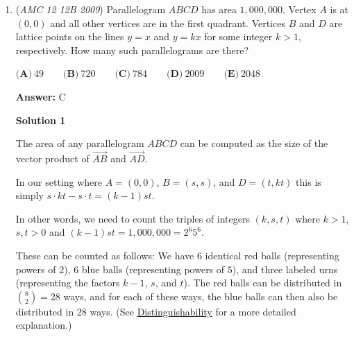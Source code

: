 \begin{enumerate}
 In the first "case" if woman \#$10$ sits in the seat \#$10$, this leads to a similar scenario, but with $9$ women instead. That means that for this case, there are a total of $S_{9}$ possible arrangements. We don't know how many exactly, but we are able to define it in terms of $S$.

 During the second "case", woman \#$10$ sits in seat \#$9$. This time, woman \#9 must go to seat \#$10$, as she is the only other person who can go there. This leaves us with $8$ women, and we again represent this in terms of $S \Rightarrow S_8$.

 Therefore, we can write $S_{10}$ in terms of $S_8$ and $S_9$, like so:

 
 \[S_{10} = S_8 + S_9.\]

 We can then generalize this to say

 
 \[S_n = S_{n-1}+S_{n-2}.\]

 Calculating $S_1 = 1$ and $S_2 =2,$ then following the recursive rule from above, we get $S_{10} = 89 \Rightarrow \boxed{\text{A}}$.

 


	\item (\textit{AMC 12 12B 2009}) Parallelogram $ABCD$ has area $1,\!000,\!000$. Vertex $A$ is at $(0,0)$ and all other vertices are in the first quadrant. Vertices $B$ and $D$ are lattice points on the lines $y = x$ and $y = kx$ for some integer $k > 1$, respectively. How many such parallelograms are there?


 $\textbf{(A)}\ 49\qquad \textbf{(B)}\ 720\qquad \textbf{(C)}\ 784\qquad \textbf{(D)}\ 2009\qquad \textbf{(E)}\ 2048$

 \textbf{Answer: }C



\textbf{Solution 1}

The area of any parallelogram $ABCD$ can be computed as the size of the vector product of $\overrightarrow{AB}$ and $\overrightarrow{AD}$.

 In our setting where $A=(0,0)$, $B=(s,s)$, and $D=(t,kt)$ this is simply $s\cdot kt - s\cdot t = (k-1)st$. 

 In other words, we need to count the triples of integers $(k,s,t)$ where $k>1$, $s,t>0$ and $(k-1)st = 1,\!000,\!000 = 2^6 5^6$.

 These can be counted as follows: We have $6$ identical red balls (representing powers of $2$), $6$ blue balls (representing powers of $5$), and three labeled urns (representing the factors $k-1$, $s$, and $t$). The red balls can be distributed in ${8\choose 2} = 28$ ways, and for each of these ways, the blue balls can then also be distributed in $28$ ways. (See \href{https://artofproblemsolving.com/wiki/index.php?title=Distinguishability}{Distinguishability} for a more detailed explanation.)


\end{enumerate}
